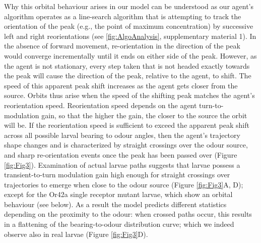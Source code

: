 \documentclass[10pt,a4paper]{article}
\begin{document}
 Why this orbital behaviour arises in our model can be understood as our agent's algorithm operates as a line-search algorithm that is attempting to track the orientation of the peak (e.g., the point of maximum concentration) by successive left and right reorientations (see \ref{fig:AlgoAnalysis}, supplementary material 1). In the absence of forward movement, re-orientation in the direction of the peak would converge incrementally until it ends on either side of the peak. However, as the agent is not stationary, every step taken that is not headed exactly towards the peak will cause the direction of the peak, relative to the agent, to shift. The speed of this apparent peak shift increases as the agent gets closer from the source. Orbits thus arise when the speed of the shifting peak matches the agent's reorientation speed. Reorientation speed depends on the agent turn-to-modulation gain, so that the higher the gain, the closer to the source the orbit will be. If the reorientation speed is sufficient to exceed the apparent peak shift across all possible larval bearing to odour angles, then the agent's trajectory shape changes and is characterized by straight crossings over the odour source, and sharp re-orientation events once the peak has been passed over (Figure \ref{fig:Fig3}). Examination of actual larvae paths suggests that larvae possess a transient-to-turn modulation gain high enough for straight crossings over trajectories to emerge when close to the odour source (Figure \ref{fig:Fig3}A, D); except for the Or42a single receptor mutant larvae, which show an orbital behaviour (see below). As a result the model predicts different statistics depending on the proximity to the odour: when crossed paths occur, this results in a flattening of the bearing-to-odour distribution curve; which we indeed observe also in real larvae (Figure \ref{fig:Fig3}D). 
\end{document}
